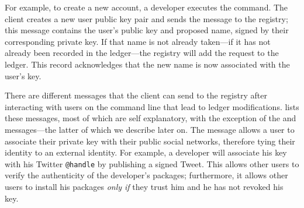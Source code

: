 For example, to create a new account, a developer executes the \spamuser{} command.
The \spam{} client creates a new user public key pair and sends the
\registeruser{} message to the registry; this message contains the user's public key
and proposed name, signed by their corresponding private key.
If that name is not already taken---if it has not already been recorded in the
ledger---the registry will add the \registeruser request to the ledger.
This record acknowledges that the new name is now associated with the user's key.

There are \numMessages different messages that the \spam client can send to the registry
after interacting with users on the command line that lead to ledger modifications.
 lists these
messages, most of which are self explanatory, with the exception of the
\proveidentity{} and \extensible{} messages---the latter of which we describe
later on. The \proveidentity{} message allows a user to associate their private key
with their public social networks, therefore tying their \spam identity to an external
identity. For example, a developer will associate his \spam{} key with his
Twitter \texttt{@handle} by publishing a signed Tweet. This allows other
users to verify the authenticity of the developer's packages; furthermore, it
allows other users to install his packages \emph{only if} they trust
him and he has not revoked his key. 


